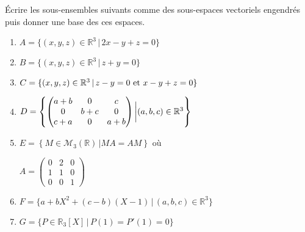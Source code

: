 \documentclass[a4paper,10pt]{report}
\begin{document}
\begin{Exa} Écrire les sous-ensembles suivants comme des sous-espaces vectoriels engendrés puis donner une base des ces espaces. 

\begin{multicols}{2}
\begin{enumerate}
\item $A=\lbrace (x,y,z) \in \mathbb{R}^3 \, \vert  \, 2x-y+z=0 \rbrace$
\item $B= \lbrace (x,y,z) \in \mathbb{R}^3 \, \vert \, z+y=0 \rbrace$
\item $C= \lbrace (x,y,z) \in \mathbb{R}^3 \, \vert \, z-y=0 \hbox{ et } x-y+z=0 \rbrace$

\item $D = \left\lbrace \begin{pmatrix}
a+b & 0 & c \\
0 & b+c & 0 \\
c+a & 0& a+b 
\end{pmatrix} \bigg{\vert} (a,b,c) \in \mathbb{R}^3 \right\rbrace$

\columnbreak
\item $E = \left\lbrace M \in \mathcal{M}_3(\mathbb{R}) \,\vert  MA=AM \right\rbrace$ où \newline \begin{center}
$A = \begin{pmatrix}
0 & 2 & 0 \\
1 & 1 & 0 \\
0 & 0 & 1 
\end{pmatrix}$
\end{center}
\item $F= \lbrace a + bX^2 + (c-b)(X-1) \, \vert \, (a,b,c) \in \mathbb{R}^3 \rbrace$
\item $G = \lbrace P \in \mathbb{R}_3[X] \, \vert \,  P(1)=P'(1)=0 \rbrace$
\end{enumerate}
\end{multicols}

\vspace{0.05cm}
\end{Exa}

\corr 
\end{document}
